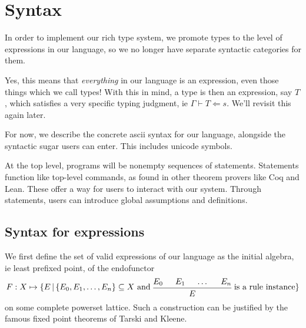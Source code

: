 \documentclass{article}
\begin{document}


\section{Syntax}
In order to implement our rich type system, we promote types to the level of
expressions in our language, so we no longer have separate syntactic categories 
for them.

Yes, this means that \textit{everything} in our language is an expression, even
those things which we call types!
With this in mind, a type is then an expression, say $T$, which satisfies a very
specific typing judgment, ie $\Gamma \vdash T \Leftarrow s$. We'll revisit
this again later.

For now, we describe the concrete ascii syntax for our language, alongside
the syntactic sugar users can enter. This includes unicode symbols.

At the top level, programs will be nonempty sequences of statements.
Statements function like top-level commands, as found in other theorem provers
like Coq and Lean. These offer a way for users to interact with our system.
Through statements, users can introduce global assumptions and definitions.

\subsection{Syntax for expressions}
We first define the set of valid expressions of our language as the initial algebra, 
ie least prefixed point, of the endofunctor
\begin{align*}
  F : X \mapsto \{ E \, | \, \{ E_0, E_1, \dots, E_n \} \subseteq X \text{ and }
    \begin{prooftree}   
      \hypo{E_0}
      \hypo{E_1}
      \hypo{\dots}
      \hypo{E_n}
      \infer4{E}
    \end{prooftree}
    \text{ is a rule instance}
  \} 
\end{align*}
on some complete powerset lattice.
Such a construction can be justified by the famous fixed point theorems of Tarski
and Kleene.
\end{document}
